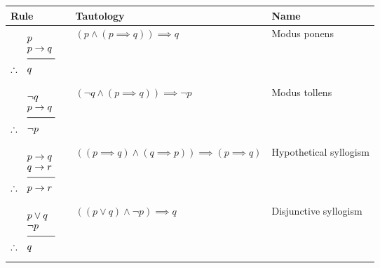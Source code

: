 \begin{table}[H]
	\scriptsize
	\renewcommand*{\arraystretch}{-1}
\begin{tabular}{m{}m{}m{}}
\textbf{Rule} & \textbf{Tautology} & \textbf{Name} \\ \toprule
\begin{equation*}
\setlength{\jot}{-0.05cm}
\begin{aligned}
&p &\\
&p \implies q & \\
&\rule[0.1cm]{1cm}{0.5pt} & \\
\therefore \quad & q & \\
\end{aligned}
\end{equation*} & \((p \wedge (p \implies q) ) \implies q \) & Modus ponens \\ \midrule

\begin{equation*}
\setlength{\jot}{-0.05cm}
\begin{aligned}
&\neg q &\\
&p \implies q & \\
&\rule[0.1cm]{1cm}{0.5pt} & \\[1pt]
\therefore \quad & \neg p& \\
\end{aligned}
\end{equation*} & \((\neg q \wedge (p \implies q) ) \implies \neg p \) & Modus tollens \\\midrule

\begin{equation*}
\setlength{\jot}{-0.05cm}
\begin{aligned}
&p \implies q &\\
&q \implies r & \\
&\rule[0.1cm]{1cm}{0.5pt} & \\
\therefore \quad & p \implies r & \\
\end{aligned}
\end{equation*} & \(((p \implies q) \wedge (q \implies p)) \implies (p \implies q) \) & Hypothetical syllogism \\\midrule

\begin{equation*}
\setlength{\jot}{-0.05cm}
\begin{aligned}
&p \vee q&\\
&\neg p & \\
&\rule[0.1cm]{1cm}{0.5pt} & \\
\therefore \quad & q & \\
\end{aligned}
\end{equation*} & \( ((p \vee q) \wedge \neg p) \implies q \) & Disjunctive syllogism \\\midrule


\end{tabular}
\end{table}
